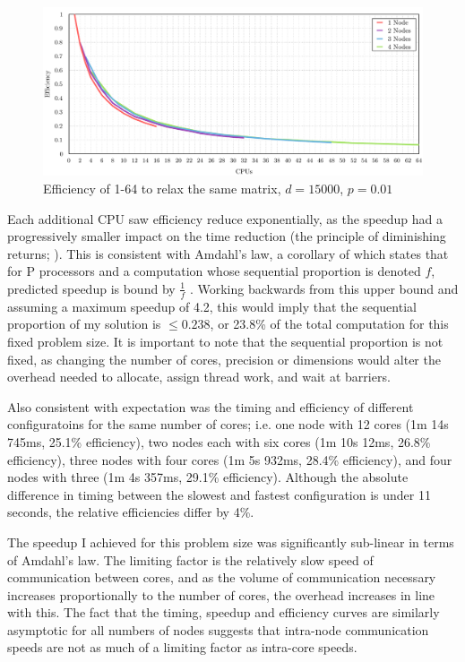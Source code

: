 \documentclass[12pt]{article}
\begin{document}
\begin{figure}[!htbp]
        \centering\includegraphics[width=\textwidth]{img/15kefficiency.pdf}
        \caption{Efficiency of 1-64 to relax the same matrix, $d=15000$, $p=0.01$}
        \label{fig:eff15}
\end{figure}

Each additional CPU saw efficiency reduce exponentially, as the speedup had a progressively smaller impact on the time reduction (the principle of diminishing returns; \citep{Amdahl}). This is consistent with Amdahl's law, a corollary of which states that for P processors and a computation whose sequential proportion is denoted $f$, predicted speedup is bound by $\frac{1}{f}$ \citep{springer}. Working backwards from this upper bound and assuming a maximum speedup of 4.2, this would imply that the sequential proportion of my solution is $\leq 0.238$, or 23.8\% of the total computation for this fixed problem size. It is important to note that the sequential proportion is not fixed, as changing the number of cores, precision or dimensions would alter the overhead needed to allocate, assign thread work, and wait at barriers.

Also consistent with expectation was the timing and efficiency of different configuratoins for the same number of cores; i.e. one node with 12 cores (1m 14s 745ms, 25.1\% efficiency), two nodes each with six cores (1m 10s 12ms, 26.8\% efficiency), three nodes with four cores (1m 5s 932ms, 28.4\% efficiency), and four nodes with three (1m 4s 357ms, 29.1\% efficiency). Although the absolute difference in timing between the slowest and fastest configuration is under 11 seconds, the relative efficiencies differ by 4\%. 

The speedup I achieved for this problem size was significantly sub-linear in terms of Amdahl's law. The limiting factor is the relatively slow speed of communication between cores, and as the volume of communication necessary increases proportionally to the number of cores, the overhead increases in line with this. The fact that the timing, speedup and efficiency curves are similarly asymptotic for all numbers of nodes suggests that intra-node communication speeds are not as much of a limiting factor as intra-core speeds.
\end{document}
